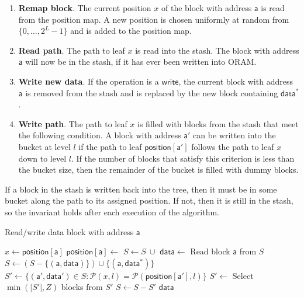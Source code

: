 \documentclass[12pt,a4paper,twoside,openright]{report}
\begin{document}
\begin{enumerate}
	\item \textbf{Remap block}. The current position $x$ of the block with address $\mathsf{a}$ is read from the position map. A new position is chosen uniformly at random from $\{0,\dots,2^L-1\}$ and is added to the position map.
	\item \textbf{Read path}. The path to leaf $x$ is read into the stash. The block with address $\mathsf{a}$ will now be in the stash, if it has ever been written into ORAM.
	\item \textbf{Write new data}. If the operation is a $\mathsf{write}$, the current block with address $\mathsf{a}$ is removed from the stash and is replaced by the new block containing $\mathsf{data^\ast}$.
	\item \textbf{Write path}. The path to leaf $x$ is filled with blocks from the stash that meet the following condition. A block with address $\mathsf{a'}$ can be written into the bucket at level $l$ if the path to leaf $\mathsf{position[a']}$ follows the path to leaf $x$ down to level $l$. If the number of blocks that satisfy this criterion is less than the bucket size, then the remainder of the bucket is filled with dummy blocks.
\end{enumerate}

If a block in the stash is written back into the tree, then it must be in some bucket along the path to its assigned position. If not, then it is still in the stash, so the invariant holds after each execution of the algorithm.

\begin{algorithm}[h]
\caption{Read/write data block with address $\mathsf{a}$}
\label{alg:access}
\footnotesize
\begin{algorithmic}[1]
    \vskip 10pt
    \vskip 10pt
    \State $x \gets \mathsf{position[a]}$
    \State $\mathsf{position[a]} \gets$ 
    \vskip 10pt
    	\State $S \gets S~\cup$ 
    \EndFor
    \vskip 10pt
    \State $\mathsf{data} \gets$ Read block $\mathsf{a}$ from $S$
    	\State $S \gets (S - \{(\mathsf{a,data})\}) \cup \{(\mathsf{a,data^*})\}$
    \EndIf
    \vskip 10pt
    	\State $S' \gets \{(\mathsf{a',data'}) \in S : \mathcal{P}(x,l) = \mathcal{P}(\mathsf{position[a']},l)\}$
    	\State $S' \gets$ Select $\min(|S'|,Z)$ blocks from $S'$
    	\State $S \gets S - S'$
    	\State {}
    \EndFor
    \vskip 10pt
    \State \Return $\mathsf{data}$
    \vskip 10pt
    \EndFunction
    \vskip 10pt
\end{algorithmic}
\end{algorithm}
\end{document}
